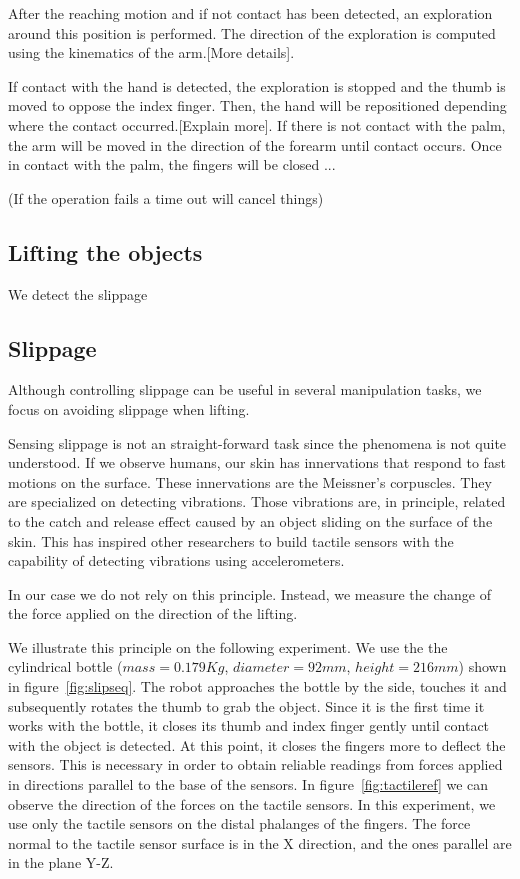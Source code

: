 After the reaching motion and if not contact has been detected, an
exploration around this position is performed. The direction of
the exploration is computed using the kinematics of the arm.[More
details].

If contact with the hand is detected, the exploration is stopped
and the thumb is moved to oppose the index finger. Then, the hand
will be repositioned depending where the contact occurred.[Explain
more].
%
If there is not contact with the palm, the arm will be moved in
the direction of the forearm until contact occurs.
%
Once in contact with the palm, the fingers will be closed ...
%



(If the operation fails a time out will cancel things)

\subsection{Lifting the objects}
We detect the slippage

\subsection{Slippage}

Although controlling slippage can be useful in several
manipulation tasks, we focus on avoiding slippage when lifting.

Sensing slippage is not an straight-forward task since the
phenomena is not quite understood. If we observe humans, our skin
has innervations that respond to fast motions on the surface.
These innervations are the Meissner's corpuscles. They are
specialized on detecting vibrations. Those vibrations are, in
principle, related to the catch and release effect caused by an
object sliding on the surface of the skin. This has inspired other
researchers to build tactile sensors with the capability of
detecting vibrations using accelerometers\cite{howe89sensing}.

In our case we do not rely on this principle. Instead, we measure
the change of the force applied on the direction of the lifting.

We illustrate this principle on the following experiment. We use
the the cylindrical bottle ($mass=0.179 Kg$, $diameter=92 mm$,
$height=216 mm$) shown in figure~\ref{fig:slipseq}. The robot
approaches the bottle by the side, touches it and subsequently
rotates the thumb to grab the object. Since it is the first time
it works with the bottle, it closes its thumb and index finger
gently until contact with the object is detected. At this point,
it closes the fingers more to deflect the sensors. This is
necessary in order to obtain reliable readings from forces applied
in directions parallel to the base of the sensors. In
figure~\ref{fig:tactileref} we can observe the direction of the
forces on the tactile sensors. In this experiment, we use only the
tactile sensors on the distal phalanges of the fingers. The force
normal to the tactile sensor surface is in the X direction, and
the ones parallel are in the plane Y-Z.

